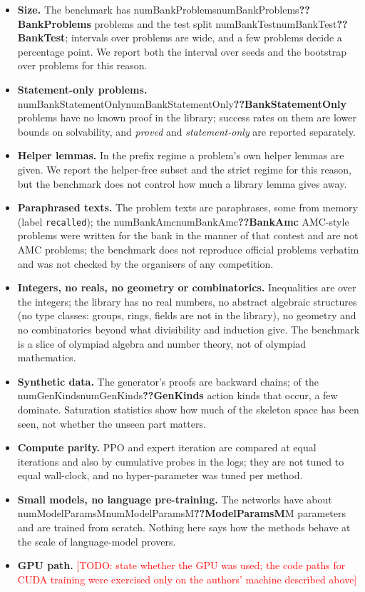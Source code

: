 \documentclass[10pt]{article}
\newcommand{\N}[1]{\ifcsname num#1\endcsname\csname num#1\endcsname\else\textbf{??#1}\fi}          %
\newcommand{\todo}[1]{\textcolor{red}{[TODO: #1]}}                                                    %
\newcommand{\code}[1]{\texttt{#1}}
\begin{document}
\begin{itemize}
\item \textbf{Size.} The benchmark has \N{BankProblems} problems and the test split \N{BankTest}; intervals over problems are wide, and a few problems decide a percentage point. We report both the interval over seeds and the bootstrap over problems for this reason.
\item \textbf{Statement-only problems.} \N{BankStatementOnly} problems have no known proof in the library; success rates on them are lower bounds on solvability, and \emph{proved} and \emph{statement-only} are reported separately.
\item \textbf{Helper lemmas.} In the prefix regime a problem's own helper lemmas are given. We report the helper-free subset and the strict regime for this reason, but the benchmark does not control how much a library lemma gives away.
\item \textbf{Paraphrased texts.} The problem texts are paraphrases, some from memory (label \code{recalled}); the \N{BankAmc} AMC-style problems were written for the bank in the manner of that contest and are not AMC problems; the benchmark does not reproduce official problems verbatim and was not checked by the organisers of any competition.
\item \textbf{Integers, no reals, no geometry or combinatorics.} Inequalities are over the integers; the library has no real numbers, no abstract algebraic structures (no type classes: groups, rings, fields are not in the library), no geometry and no combinatorics beyond what divisibility and induction give. The benchmark is a slice of olympiad algebra and number theory, not of olympiad mathematics.
\item \textbf{Synthetic data.} The generator's proofs are backward chains; of the \N{GenKinds} action kinds that occur, a few dominate. Saturation statistics show how much of the skeleton space has been seen, not whether the unseen part matters.
\item \textbf{Compute parity.} PPO and expert iteration are compared at equal iterations and also by cumulative probes in the logs; they are not tuned to equal wall-clock, and no hyper-parameter was tuned per method.
\item \textbf{Small models, no language pre-training.} The networks have about \N{ModelParamsM}M parameters and are trained from scratch. Nothing here says how the methods behave at the scale of language-model provers.
\item \textbf{GPU path.} \todo{state whether the GPU was used; the code paths for CUDA training were exercised only on the authors' machine described above}
\end{itemize}
\end{document}
